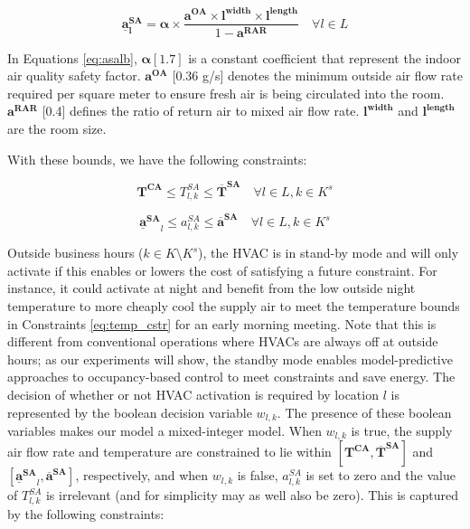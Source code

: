\begin{equation} \label{eq:asalb}
\bm{\underline{a}_{l}^{SA}} = \bm{\alpha} \times \frac{\bm{a^{OA}} \times \bm{l^{width}} \times \bm{l^{length}}}{1-\bm{a^{RAR}}} \quad \forall l\in L
\end{equation}

\noindent In Equations \eqref{eq:asalb}, $\bm \alpha [1.7]$ is a constant coefficient that represent the indoor air quality safety factor. $\bm{a^{OA}}$ [0.36 g/s] denotes the minimum outside air flow rate required per square meter to ensure fresh air is being circulated into the room. $\bm{a^{RAR}}$ [0.4] defines the ratio of return air to mixed air flow rate. $\bm{l^{width}}$ and $\bm{l^{length}}$ are the room size. 

With these bounds, we have the following constraints:


\begin{equation} \label{eq:hvac_active_TSA}
\bm{T^{CA}} \leq T_{l,k}^{SA} \leq \bm{\overline{T}^{SA}}  \quad \forall l \in L, k\in K^s
\end{equation}

\begin{equation} \label{eq:hvac_active_ASA}
\bm{\underline{a}^{SA}}_{l} \leq a_{l,k}^{SA}  \leq \bm{\overline{a}^{SA}}   \quad \forall l \in L, k\in K^s
\end{equation}

Outside business hours ($k\in K\setminus K^s$), the HVAC is in stand-by mode and will only activate if this enables or lowers the
cost of satisfying a future constraint. For instance, it could activate at night and benefit from the low outside night temperature
to more cheaply cool the supply air to meet the temperature bounds in Constraints \eqref{eq:temp_cstr} for an early morning meeting. Note that this is different from conventional operations where HVACs are always off at outside hours; as our experiments will show, the standby mode enables
model-predictive approaches to occupancy-based control to meet constraints and save energy. The decision of whether or not HVAC
activation is required by location $l$ is represented by the boolean decision variable $w_{l,k}$. The presence of these boolean variables
makes our model a mixed-integer model. When $w_{l,k}$ is true, the supply air flow rate and temperature are constrained to lie within
$[\bm{T^{CA}}, \bm{\overline{T}^{SA}}]$ and $[\bm{\underline{a}^{SA}}_{l},\bm{\overline{a}^{SA}}]$, respectively, and when $w_{l,k}$ is false, $a_{l,k}^{SA}$ is set to zero and the value of $T_{l,k}^{SA}$ is irrelevant (and for simplicity may as well also be zero). This is captured by the following
constraints:

